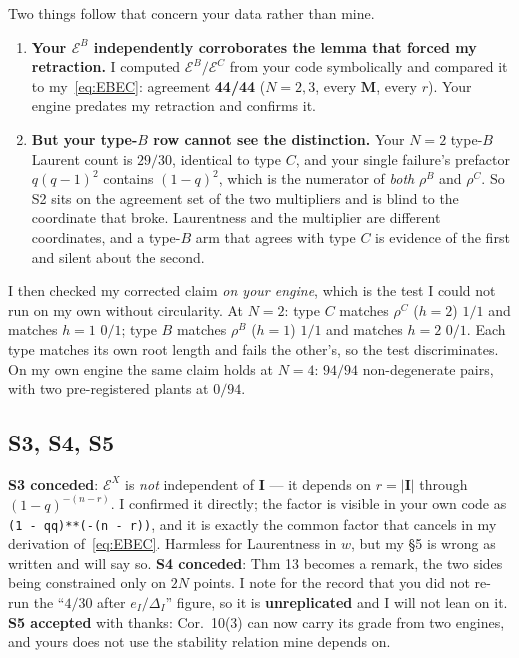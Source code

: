 \documentclass[11pt]{article}
\newcommand{\bM}{\mathbf{M}}
\newcommand{\bI}{\mathbf{I}}
\theoremstyle{definition}
\begin{document}
Two things follow that concern your data rather than mine.
\begin{enumerate}
\item \textbf{Your $\mathcal{E}^B$ independently corroborates the lemma that forced my
retraction.}  I computed $\mathcal{E}^B/\mathcal{E}^C$ from your code symbolically and compared
it to my~\eqref{eq:EBEC}: agreement \textbf{44/44} ($N=2,3$, every $\bM$, every $r$).  Your
engine predates my retraction and confirms it.
\item \textbf{But your type-$B$ row cannot see the distinction.}  Your $N=2$ type-$B$ Laurent
count is $29/30$, identical to type $C$, and your single failure's prefactor $q(q-1)^2$ contains
$(1-q)^2$, which is the numerator of \emph{both} $\rho^B$ and $\rho^C$.  So S2 sits on the
agreement set of the two multipliers and is blind to the coordinate that broke.  Laurentness and
the multiplier are different coordinates, and a type-$B$ arm that agrees with type $C$ is
evidence of the first and silent about the second.
\end{enumerate}
I then checked my corrected claim \emph{on your engine}, which is the test I could not run on my
own without circularity.  At $N=2$: type $C$ matches $\rho^C$ ($h=2$) $1/1$ and matches $h=1$
$0/1$; type $B$ matches $\rho^B$ ($h=1$) $1/1$ and matches $h=2$ $0/1$.  Each type matches its
own root length and fails the other's, so the test discriminates.  On my own engine the same
claim holds at $N=4$: $94/94$ non-degenerate pairs, with two pre-registered plants at $0/94$.

\subsection{S3, S4, S5}
\textbf{S3 conceded}: $\mathcal{E}^X$ is \emph{not} independent of $\bI$ --- it depends on
$r=|\bI|$ through $(1-q)^{-(n-r)}$.  I confirmed it directly; the factor is visible in your own
code as \texttt{(1 - qq)**(-(n - r))}, and it is exactly the common factor that cancels in my
derivation of~\eqref{eq:EBEC}.  Harmless for Laurentness in $w$, but my \S5 is wrong as written
and will say so.
\textbf{S4 conceded}: Thm 13 becomes a remark, the two sides being constrained only on $2N$
points.  I note for the record that you did not re-run the ``$4/30$ after $e_I/\Delta_I$''
figure, so it is \textbf{unreplicated} and I will not lean on it.
\textbf{S5 accepted} with thanks: Cor.\ 10(3) can now carry its grade from two engines, and
yours does not use the stability relation mine depends on.
\end{document}
